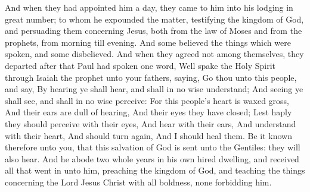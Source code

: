  And when they had appointed him a day, they came to him into his lodging in great number; to whom he expounded the matter, testifying the kingdom of God, and persuading them concerning Jesus, both from the law of Moses and from the prophets, from morning till evening. And some believed the things which were spoken, and some disbelieved. And when they agreed not among themselves, they departed after that Paul had spoken one word, Well spake the Holy Spirit through Isaiah the prophet unto your fathers, saying, Go thou unto this people, and say, By hearing ye shall hear, and shall in no wise understand; And seeing ye shall see, and shall in no wise perceive:  For this people’s heart is waxed gross, And their ears are dull of hearing, And their eyes they have closed; Lest haply they should perceive with their eyes, And hear with their ears, And understand with their heart, And should turn again, And I should heal them.  Be it known therefore unto you, that this salvation of God is sent unto the Gentiles: they will also hear.   And he abode two whole years in his own hired dwelling, and received all that went in unto him, preaching the kingdom of God, and teaching the things concerning the Lord Jesus Christ with all boldness, none forbidding him. 